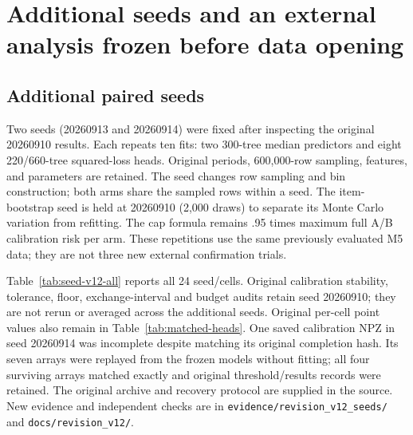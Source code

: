 \section{Additional seeds and an external analysis frozen before data opening}
\label{app:additional-v12}
\subsection{Additional paired seeds}\label{app:seeds-v12}
Two seeds (20260913 and 20260914) were fixed after inspecting the original 20260910 results. Each repeats ten fits: two 300-tree median predictors and eight 220/660-tree squared-loss heads. Original periods, 600,000-row sampling, features, and parameters are retained. The seed changes row sampling and bin construction; both arms share the sampled rows within a seed. The item-bootstrap seed is held at 20260910 (2,000 draws) to separate its Monte Carlo variation from refitting. The cap formula remains .95 times maximum full A/B calibration risk per arm. These repetitions use the same previously evaluated M5 data; they are not three new external confirmation trials.

Table~\ref{tab:seed-v12-all} reports all 24 seed/cells. Original calibration stability, tolerance, floor, exchange-interval and budget audits retain seed 20260910; they are not rerun or averaged across the additional seeds. Original per-cell point values also remain in Table~\ref{tab:matched-heads}. One saved calibration NPZ in seed 20260914 was incomplete despite matching its original completion hash. Its seven arrays were replayed from the frozen models without fitting; all four surviving arrays matched exactly and original threshold/results records were retained. The original archive and recovery protocol are supplied in the source. New evidence and independent checks are in \texttt{evidence/revision\_v12\_seeds/} and \texttt{docs/revision\_v12/}.

